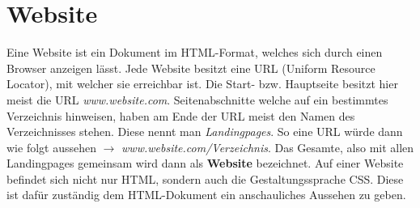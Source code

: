 \section{Website}
\label{websitetheorie}

Eine Website ist ein Dokument im HTML-Format, welches sich durch einen Browser anzeigen lässt.
Jede Website besitzt eine URL (Uniform Resource Locator), mit welcher sie erreichbar ist.
Die Start- bzw. Hauptseite besitzt hier meist die URL \textit{www.website.com}. Seitenabschnitte 
welche auf ein bestimmtes Verzeichnis hinweisen, haben am Ende der URL meist den Namen des 
Verzeichnisses stehen. Diese nennt man \textit{Landingpages}. So eine URL würde dann wie folgt aussehen $\rightarrow$ 
\textit{www.website.com/Verzeichnis}. Das Gesamte, also mit allen Landingpages 
gemeinsam wird dann als \textbf{Website} bezeichnet. Auf einer Website befindet sich nicht nur HTML, 
sondern auch die Gestaltungssprache CSS. Diese ist dafür zuständig dem HTML-Dokument ein 
anschauliches Aussehen zu geben.~\cite{Website}